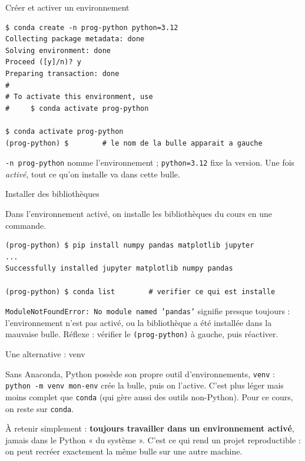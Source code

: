 \documentclass[aspectratio=169,11pt]{beamer}
\begin{document}
\begin{frame}[fragile]{Créer et activer un environnement}
\begin{lstlisting}[style=sh]
$ conda create -n prog-python python=3.12
Collecting package metadata: done
Solving environment: done
Proceed ([y]/n)? y
Preparing transaction: done
#
# To activate this environment, use
#     $ conda activate prog-python

$ conda activate prog-python
(prog-python) $        # le nom de la bulle apparait a gauche
\end{lstlisting}
{\small \texttt{-n prog-python} nomme l'environnement ; \texttt{python=3.12} fixe la version. Une fois \emph{activé}, tout ce qu'on installe va dans cette bulle.}
\end{frame}

\begin{frame}[fragile]{Installer des bibliothèques}
\begin{ucadex}
{\small Dans l'environnement activé, on installe les bibliothèques du cours en une commande.}
\end{ucadex}
\begin{lstlisting}[style=sh]
(prog-python) $ pip install numpy pandas matplotlib jupyter
...
Successfully installed jupyter matplotlib numpy pandas

(prog-python) $ conda list        # verifier ce qui est installe
\end{lstlisting}
\begin{ucadpiege}
{\small \texttt{ModuleNotFoundError: No module named 'pandas'} signifie presque toujours : l'environnement n'est pas activé, ou la bibliothèque a été installée dans la mauvaise bulle. Réflexe : vérifier le \texttt{(prog-python)} à gauche, puis réactiver.}
\end{ucadpiege}
\end{frame}

\begin{frame}{Une alternative : venv}
\begin{ucadfront}
{\small Sans Anaconda, Python possède son propre outil d'environnements, \texttt{venv} : \texttt{python -m venv mon-env} crée la bulle, puis on l'active. C'est plus léger mais moins complet que \texttt{conda} (qui gère aussi des outils non-Python). Pour ce cours, on reste sur \texttt{conda}.}
\end{ucadfront}
{\small À retenir simplement : \textbf{toujours travailler dans un environnement activé}, jamais dans le Python « du système ». C'est ce qui rend un projet reproductible : on peut recréer exactement la même bulle sur une autre machine.}
\end{frame}
\end{document}
